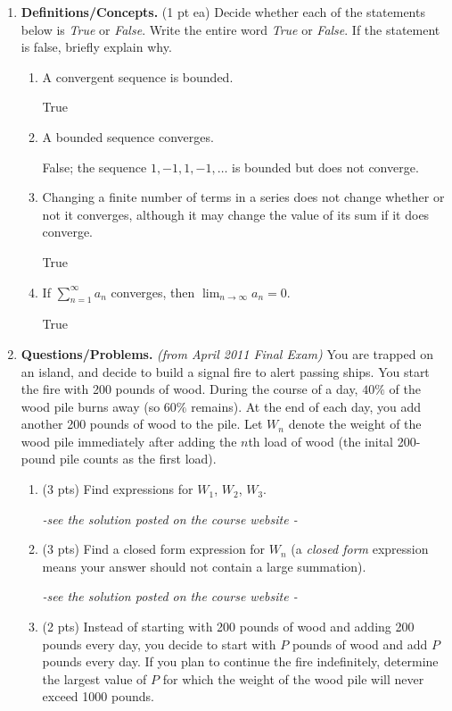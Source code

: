 \documentclass[11pt,letterpaper]{article}
\begin{document}
\begin{enumerate}
\item  \textbf{Definitions/Concepts.} (1 pt ea) Decide whether each of the statements below is \emph{True} or \emph{False}.  Write the entire word \emph{True} or \emph{False}.  If the statement is false, briefly explain why. 
\begin{enumerate}
\item A convergent sequence is bounded.

True
\vfill
\item A bounded sequence converges.

False; the sequence $1,-1,1,-1,\dots$ is bounded but does not converge.
\vfill 
\item Changing a finite number of terms in a series does not change whether or not it converges, although it may change the value of its sum if it does converge.

True
\vfill
\item If $\sum_{n=1}^{\infty}a_n$ converges, then $\lim_{n\to\infty}a_n=0$.

True
\vfill
\end{enumerate}
 
\item \textbf{Questions/Problems.} {\it (from April 2011 Final Exam)} You are trapped on an island, and decide to build a signal fire to alert passing ships.  You start the fire with 200 pounds of wood.  During the course of a day, $40\%$ of the wood pile burns away (so $60\%$ remains).  At the end of each day, you add another 200 pounds of wood to the pile.  Let $W_n$ denote the weight of the wood pile immediately after adding the $n$th load of wood (the inital 200-pound pile counts as the first load).

\begin{enumerate}
\item (3 pts) Find expressions for $W_1$, $W_2$, $W_3$.

{\it -see the solution posted on the course website -}
\vspace{10pc}
\item (3 pts) Find a closed form expression for $W_n$ (a {\it closed form} expression means your answer should not contain a large summation).

{\it -see the solution posted on the course website -}
\item (2 pts) Instead of starting with 200 pounds of wood and adding 200 pounds every day, you decide to start with $P$ pounds of wood and add $P$ pounds every day.  If you plan to continue the fire indefinitely, determine the largest value of $P$ for which the weight of the wood pile will never exceed 1000 pounds.


\end{enumerate}
\end{enumerate}
\end{document}
